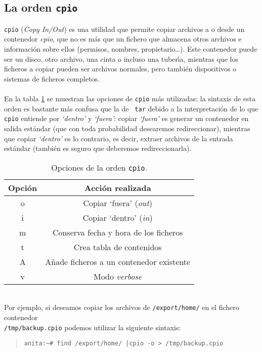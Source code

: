 \subsection{La orden {\tt cpio}}
{\tt cpio} ({\it Copy In/Out}) es una utilidad que permite copiar archivos a 
o desde un contenedor {\it cpio}, que no es m\'as que un fichero que almacena
otros archivos e informaci\'on sobre ellos (permisos, nombres, 
propietario\ldots). Este contenedor puede ser un disco, otro archivo, una
cinta o incluso una tuber\'{\i}a, mientras que los ficheros a copiar pueden
ser archivos normales, pero tambi\'en dispositivos o sistemas de ficheros
completos.\\
\\En la tabla \ref{cpioops} se muestran las opciones de {\tt cpio} m\'as
utilizadas; la sintaxis de esta orden es bastante m\'as confusa que la de {\tt 
tar} debido a la interpretaci\'on de lo que {\tt cpio} entiende por {\it 
`dentro'} y {\it `fuera'}: copiar {\it `fuera'} es generar un contenedor en
salida est\'andar (que con toda probabilidad desearemos redireccionar), 
mientras que copiar {\it `dentro'} es lo contrario, es decir, extraer archivos
de la entrada est\'andar (tambi\'en es seguro que deberemos redireccionarla).\\
\begin{table}
\begin{center}
\begin{tabular}{|c|c|}
\hline
Opci\'on & Acci\'on realizada\\
\hline\hline
o & Copiar `fuera' ({\it out})\\
\hline
i & Copiar `dentro' ({\it in})\\
\hline
m & Conserva fecha y hora de los ficheros\\
\hline
t & Crea tabla de contenidos\\
\hline
A & A\~nade ficheros a un contenedor existente\\
\hline
v & Modo {\it verbose}\\
\hline
\end{tabular}
\caption{Opciones de la orden {\tt cpio}.}
\label{cpioops}
\end{center}
\end{table}
\\Por ejemplo, si deseamos copiar los archivos de {\tt /export/home/} en el 
fichero contenedor\\ {\tt /tmp/backup.cpio}
podemos utilizar la siguiente sintaxis:
\begin{quote}
\begin{verbatim}
anita:~# find /export/home/ |cpio -o > /tmp/backup.cpio
\end{verbatim}
\end{quote}
